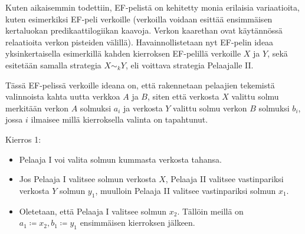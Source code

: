 \documentclass[finnish]{tktltiki2}
\theoremstyle{definition}
\theoremstyle{remark}
\begin{document}
Kuten aikaisemmin todettiin, EF-pelistä on kehitetty monia erilaisia variaatioita, kuten esimerkiksi EF-peli verkoille (verkoilla voidaan esittää ensimmäisen kertaluokan predikaattilogiikan kaavoja. Verkon kaarethan ovat käytännössä relaatioita verkon pisteiden välillä). Havainnollistetaan nyt EF-pelin ideaa yksinkertaisella esimerkillä kahden kierroksen EF-pelillä verkoille $X$ ja $Y$, sekä esitetään samalla strategia $X \sim_k Y$, eli voittava strategia Pelaajalle II.

Tässä EF-pelissä verkoille ideana on, että rakennetaan pelaajien tekemistä valinnoista kahta uutta verkkoa $A$ ja $B$, siten että verkosta $X$ valittu solmu merkitään verkon $A$ solmuksi $a_i$ ja verkosta $Y$ valittu solmu verkon $B$ solmuksi $b_i$, jossa $i$ ilmaisee millä kierroksella valinta on tapahtunut.

\begin {center}
\end{center}


Kierros 1:
\begin{itemize}
  \item Pelaaja I voi valita solmun kummasta verkosta tahansa.
  \item Jos Pelaaja I valitsee solmun verkosta $X$, Pelaaja II valitsee vastinpariksi verkosta $Y$ solmun $y_1$, muulloin Pelaaja II valitsee vastinpariksi solmun $x_1$.
  \item Oletetaan, että Pelaaja I valitsee solmun $x_2$. Tällöin meillä on $a_1 \coloneqq x_2, b_1 \coloneqq y_1$ ensimmäisen kierroksen jälkeen.
\end{itemize}
\end{document}
